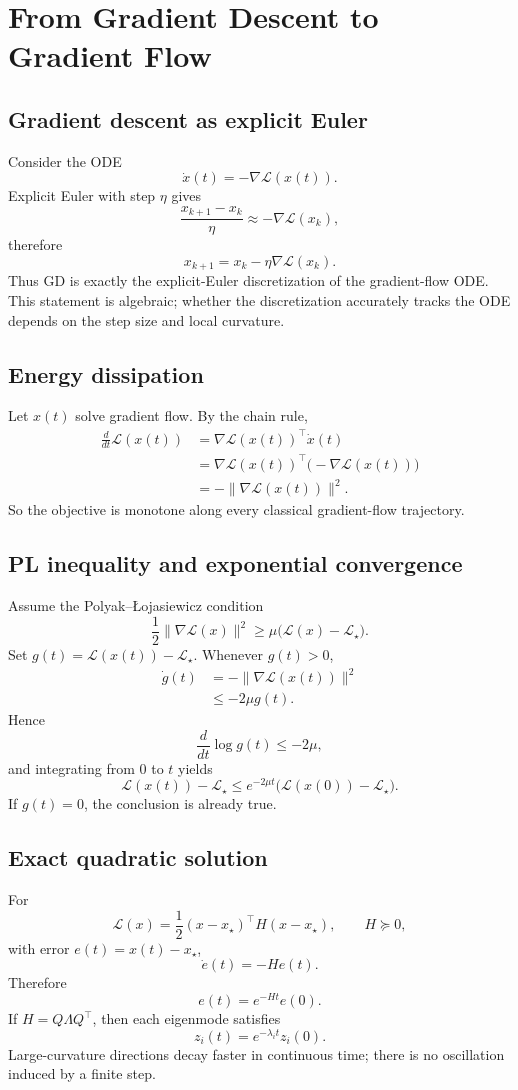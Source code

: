 \documentclass[11pt,a4paper,oneside,openany]{memoir}
\theoremstyle{definition}
\begin{document}
\chapter{From Gradient Descent to Gradient Flow}

\section{Gradient descent as explicit Euler}
Consider the ODE
\[
\dot x(t)=-\nabla \mathcal L(x(t)).
\]
Explicit Euler with step $\eta$ gives
\[
\frac{x_{k+1}-x_k}{\eta}\approx -\nabla\mathcal L(x_k),
\]
therefore
\[
x_{k+1}=x_k-\eta\nabla\mathcal L(x_k).
\]
Thus GD is exactly the explicit-Euler discretization of the gradient-flow ODE.  This statement is algebraic; whether the discretization accurately tracks the ODE depends on the step size and local curvature.

\section{Energy dissipation}
Let $x(t)$ solve gradient flow.  By the chain rule,
\begin{align*}
\frac{d}{dt}\mathcal L(x(t))
&=\nabla\mathcal L(x(t))^\top\dot x(t)\\
&=\nabla\mathcal L(x(t))^\top\bigl(-\nabla\mathcal L(x(t))\bigr)\\
&=-\|\nabla\mathcal L(x(t))\|^2.
\end{align*}
So the objective is monotone along every classical gradient-flow trajectory.

\section{PL inequality and exponential convergence}
Assume the Polyak--\L{}ojasiewicz condition
\[
\frac12\|\nabla\mathcal L(x)\|^2\ge \mu\bigl(\mathcal L(x)-\mathcal L_\star\bigr).
\]
Set $g(t)=\mathcal L(x(t))-\mathcal L_\star$.  Whenever $g(t)>0$,
\begin{align*}
\dot g(t)
&=-\|\nabla\mathcal L(x(t))\|^2\\
&\le -2\mu g(t).
\end{align*}
Hence
\[
\frac{d}{dt}\log g(t)\le -2\mu,
\]
and integrating from $0$ to $t$ yields
\[
\boxed{\mathcal L(x(t))-\mathcal L_\star
\le e^{-2\mu t}\bigl(\mathcal L(x(0))-\mathcal L_\star\bigr).}
\]
If $g(t)=0$, the conclusion is already true.

\section{Exact quadratic solution}
For
\[
\mathcal L(x)=\frac12(x-x_\star)^\top H(x-x_\star),\qquad H\succeq0,
\]
with error $e(t)=x(t)-x_\star$,
\[
\dot e(t)=-He(t).
\]
Therefore
\[
e(t)=e^{-Ht}e(0).
\]
If $H=Q\Lambda Q^\top$, then each eigenmode satisfies
\[
z_i(t)=e^{-\lambda_i t}z_i(0).
\]
Large-curvature directions decay faster in continuous time; there is no oscillation induced by a finite step.
\end{document}
